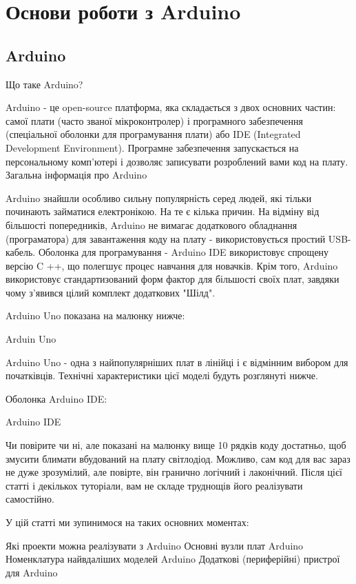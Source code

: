 \documentclass[12pt,a4paper]{report}  %
\begin{document}
\chapter{Основи роботи з Arduino}

\section{Arduino}

Що таке Arduino?

Arduino - це open-source платформа, яка складається з двох основних частин: самої плати (часто званої мікроконтролер) і програмного забезпечення (спеціальної оболонки для програмування плати) або IDE (Integrated Development Environment). Програмне забезпечення запускається на персональному комп'ютері і дозволяє записувати розроблений вами код на плату.
Загальна інформація про Arduino

Arduino знайшли особливо сильну популярність серед людей, які тільки починають займатися електронікою. На те є кілька причин. На відміну від більшості попередників, Arduino не вимагає додаткового обладнання (програматора) для завантаження коду на плату - використовується простий USB-кабель. Оболонка для програмування - Arduino IDE використовує спрощену версію C ++, що полегшує процес навчання для новачків. Крім того, Arduino використовує стандартизований форм фактор для більшості своїх плат, завдяки чому з'явився цілий комплект додаткових "Шілд".

Arduino Uno показана на малюнку нижче:

Arduin Uno

Arduino Uno - одна з найпопулярніших плат в лінійці і є відмінним вибором для початківців. Технічні характеристики цієї моделі будуть розглянуті нижче.

Оболонка Arduino IDE:

Arduino IDE

Чи повірите чи ні, але показані на малюнку вище 10 рядків коду достатньо, щоб змусити блимати вбудований на плату світлодіод. Можливо, сам код для вас зараз не дуже зрозумілий, але повірте, він гранично логічний і лаконічний. Після цієї статті і декількох туторіали, вам не складе труднощів його реалізувати самостійно.

У цій статті ми зупинимося на таких основних моментах:

    Які проекти можна реалізувати з Arduino
    Основні вузли плат Arduino
    Номенклатура найвдаліших моделей Arduino
    Додаткові (периферійні) пристрої для Arduino
\end{document}
